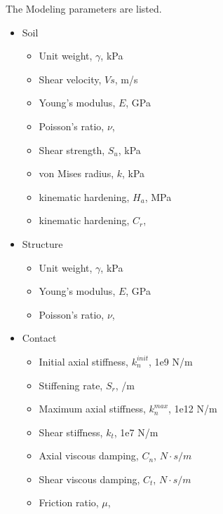 The Modeling parameters are listed.
\begin{itemize}
  \item Soil 
  \begin{itemize}
    \item Unit weight, $\gamma$, \enspace {} kPa
    \item Shear velocity, $Vs$, \enspace {} m/s
    \item Young's modulus, $E$, \enspace {} GPa
    \item Poisson's ratio, $\nu$, \enspace {}
    \item Shear strength, $S_u$, \enspace {} kPa
    \item von Mises radius, $k$, \enspace {} kPa
    \item kinematic hardening, $H_a$, \enspace {} MPa
    \item kinematic hardening, $C_r$, \enspace {}
  \end{itemize}
  \item Structure
  \begin{itemize}
    \item Unit weight, $\gamma$, \enspace {} kPa
    \item Young's modulus, $E$, \enspace {} GPa
    \item Poisson's ratio, $\nu$, \enspace {}
  \end{itemize}
  \item Contact 
  \begin{itemize}
    \item Initial axial stiffness, $k_n^{init}$,  \enspace \enspace  1e9 N/m
    \item Stiffening rate, $S_r$,  \enspace {} /m 
    \item Maximum axial stiffness, $k_n^{max}$,  \enspace \enspace  1e12 N/m
    \item Shear stiffness, $k_t$,  \enspace \enspace  1e7 N/m
    \item Axial viscous damping, $C_n$,  \enspace {} $N\cdot s /m$
    \item Shear viscous damping, $C_t$,  \enspace {} $N\cdot s /m$
    \item Friction ratio, $\mu$,  \enspace {}
  \end{itemize}
\end{itemize}



